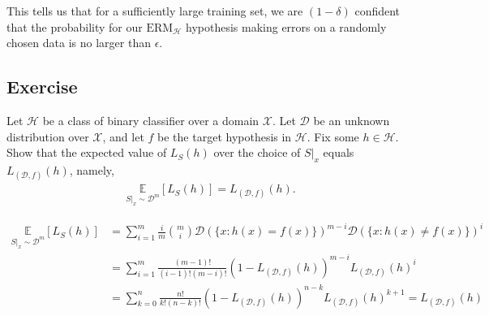\begin{intuition}
    This tells us that for a sufficiently large training set, we are $(1-\delta)$ confident that the probability for our $\text{ERM}_\mathcal{H}$ hypothesis making errors on a randomly chosen data is no larger than $\epsilon$.
\end{intuition}

\subsection{Exercise} \label{sec:}
\Problem Let $\mathcal{H}$ be a class of binary classifier over a domain $\mathcal{X}$. Let $\mathcal{D}$ be an unknown distribution over $\mathcal{X}$, and let $f$ be the target hypothesis in $\mathcal{H}$. Fix some $h \in \mathcal{H}$. Show that the expected value of $L_S(h)$ over the choice of $S|_x$ equals $L_{(\mathcal{D},f)}(h)$, namely,
\begin{align*}
    \underset{S|_x \sim \mathcal{D}^{m}}{\mathbb{E}}[L_S(h)] = L_{(\mathcal{D},f)}(h).
\end{align*}

\TheSolution \begin{align*}
    \underset{S|_x \sim \mathcal{D}^{m}}{\mathbb{E}}[L_S(h)] &= \sum\limits_{i = 1}^{m}\frac{i}{m} {m \choose i} \mathcal{D}(\{ x : h(x) = f(x) \})^{m-i} \mathcal{D}(\{ x : h(x) \neq f(x) \})^{i} 
    \\ &= \sum\limits_{i = 1}^{m} \frac{(m-1)!}{(i-1)!(m-i)!} (1-L_{(\mathcal{D},f)}(h))^{m-i} L_{(\mathcal{D},f)}(h)^{i}
    \\ &= \sum\limits_{k = 0}^{n} \frac{n!}{k!(n-k)!} (1-L_{(\mathcal{D},f)}(h))^{n-k} L_{(\mathcal{D},f)}(h)^{k + 1} = L_{(\mathcal{D},f)}(h)
\end{align*}

\newpage
